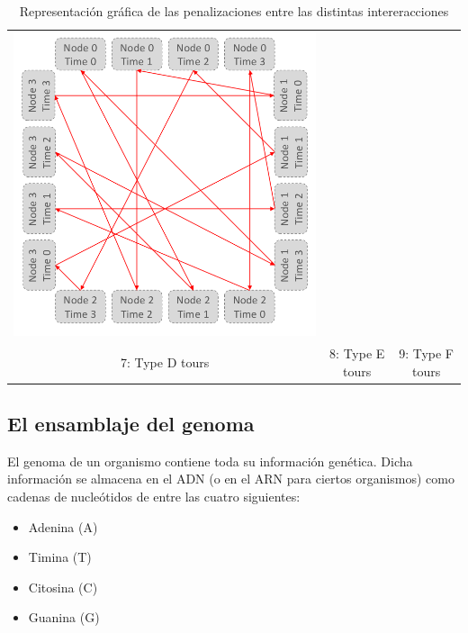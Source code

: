 \documentclass[11pt]{article}
\begin{document}
\begin{table}[H]
{\begin{tabular}{ccc}
			\includegraphics[scale=0.2]{figures/salesman-penalties9.png} \\
			
			7: Type D tours & 8: Type E tours & 9: Type F tours \\
		\end{tabular}
	}
	\caption{Representación gráfica de las penalizaciones entre las distintas intereracciones}
	\label{fig:salesman-penalties}
\end{table}

\subsection{El ensamblaje del genoma}

El genoma de un organismo contiene toda su información genética. Dicha información se almacena en el ADN (o en el ARN para ciertos organismos) como cadenas de nucleótidos de entre las cuatro siguientes:

\begin{itemize}
	\item Adenina (A)
	\item Timina (T)
	\item Citosina (C) 
	\item Guanina (G)
\end{itemize}
\end{document}
